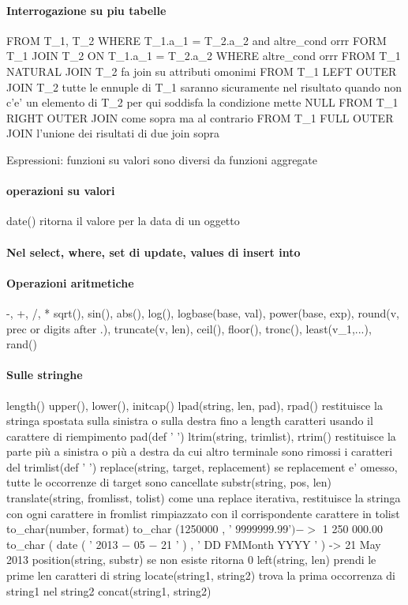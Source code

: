 \documentclass[12pt]{article}
\begin{document}
\paragraph{Interrogazione su piu tabelle}
			FROM T_1, T_2
			WHERE T_1.a_1 = T_2.a_2 and altre_cond
				orrr
			FORM T_1 JOIN T_2
			ON T_1.a_1 = T_2.a_2
			WHERE altre_cond
				orrr
			FROM T_1 NATURAL JOIN T_2  fa join su attributi omonimi
			FROM T_1 LEFT OUTER JOIN T_2 tutte le ennuple di T_1 saranno sicuramente nel risultato quando non c'e' un elemento di T_2 per qui soddisfa la condizione mette NULL
			FROM T_1 RIGHT OUTER JOIN come sopra ma al contrario
			FROM T_1 FULL OUTER JOIN l'unione dei risultati di due join sopra
		
		Espressioni: funzioni su valori sono diversi da funzioni aggregate
\paragraph{operazioni su valori}
				date() ritorna il valore per la data di un oggetto

\paragraph{Nel select, where, set di update, values di insert into}
\paragraph{Operazioni aritmetiche}
					-, +, /, * 
					sqrt(), sin(), abs(), log(), logbase(base, val), power(base, exp), round(v, prec or digits after .), truncate(v, len), ceil(), floor(), tronc(), least(v_1,...), rand()
\paragraph{Sulle stringhe}
					length()
					upper(), lower(), initcap()
					lpad(string, len, pad), rpad() restituisce la stringa spostata sulla sinistra o sulla destra fino a length caratteri usando il carattere di riempimento pad(def ' ')
					ltrim(string, trimlist), rtrim() restituisce la parte più a sinistra o più a destra da cui altro terminale sono rimossi i caratteri del trimlist(def ' ')
					replace(string, target, replacement) se replacement e' omesso, tutte le occorrenze di target sono cancellate
					substr(string, pos, len)
					translate(string, fromlisst, tolist) come una replace iterativa, restituisce la stringa con ogni carattere in fromlist rimpiazzato con il corrispondente carattere in tolist
					to_char(number, format)
						to_char (1250000 , ’ $9 999 999.99 ’ ) -> $ 1 250 000.00
						to_char ( date ( ’ 2013 − 05 − 21 ’ ) , ’ DD FMMonth YYYY ’ ) -> 21 May 2013
					position(string, substr) se non esiste ritorna 0
					left(string, len) prendi le prime len caratteri di string
					locate(string1, string2) trova la prima occorrenza di string1 nel string2
					concat(string1, string2)
\end{document}
